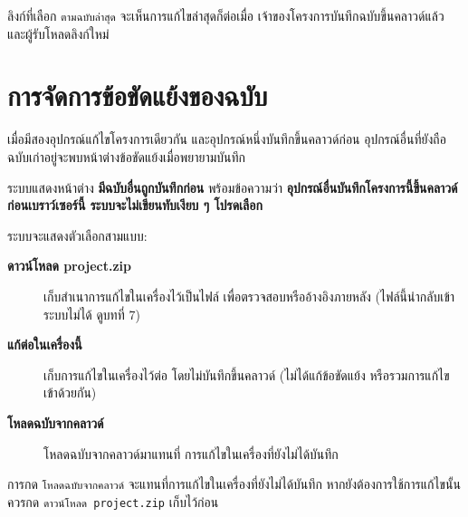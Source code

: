 

\begin{note}
ลิงก์ที่เลือก \texttt{ตามฉบับล่าสุด} จะเห็นการแก้ไขล่าสุดก็ต่อเมื่อ
เจ้าของโครงการบันทึกฉบับขึ้นคลาวด์แล้ว และผู้รับโหลดลิงก์ใหม่
\end{note}

\section{การจัดการข้อขัดแย้งของฉบับ}

เมื่อมีสองอุปกรณ์แก้ไขโครงการเดียวกัน และอุปกรณ์หนึ่งบันทึกขึ้นคลาวด์ก่อน
อุปกรณ์อื่นที่ยังถือฉบับเก่าอยู่จะพบหน้าต่างข้อขัดแย้งเมื่อพยายามบันทึก

\begin{expected}
ระบบแสดงหน้าต่าง \textbf{มีฉบับอื่นถูกบันทึกก่อน} พร้อมข้อความว่า
\textbf{อุปกรณ์อื่นบันทึกโครงการนี้ขึ้นคลาวด์ก่อนเบราว์เซอร์นี้
ระบบจะไม่เขียนทับเงียบ ๆ โปรดเลือก}
\end{expected}


ระบบจะแสดงตัวเลือกสามแบบ:

\begin{description}
  \item[\textbf{ดาวน์โหลด project.zip}] เก็บสำเนาการแก้ไขในเครื่องไว้เป็นไฟล์
        เพื่อตรวจสอบหรืออ้างอิงภายหลัง (ไฟล์นี้นำกลับเข้าระบบไม่ได้ ดูบทที่ 7)
  \item[\textbf{แก้ต่อในเครื่องนี้}] เก็บการแก้ไขในเครื่องไว้ต่อ
        โดยไม่บันทึกขึ้นคลาวด์ (ไม่ได้แก้ข้อขัดแย้ง หรือรวมการแก้ไขเข้าด้วยกัน)
  \item[\textbf{โหลดฉบับจากคลาวด์}] โหลดฉบับจากคลาวด์มาแทนที่
        การแก้ไขในเครื่องที่ยังไม่ได้บันทึก
\end{description}

\begin{caution}
การกด \texttt{โหลดฉบับจากคลาวด์} จะแทนที่การแก้ไขในเครื่องที่ยังไม่ได้บันทึก
หากยังต้องการใช้การแก้ไขนั้น ควรกด \texttt{ดาวน์โหลด project.zip} เก็บไว้ก่อน
\end{caution}

